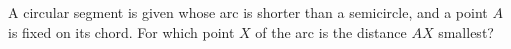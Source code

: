 A circular segment is given whose arc is shorter than a semicircle, and a point $A$ is fixed on its chord. For which point $X$ of the arc is the distance $AX$ smallest?
